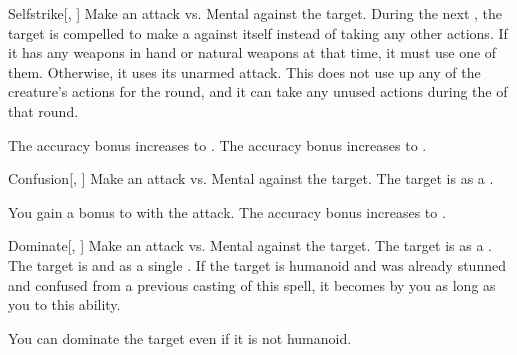 \lowercase{\hypertarget{spell:Selfstrike}{}}\label{spell:Selfstrike}
\begin{freeability}[Rank 4]{\hypertarget{spell:Selfstrike}{Selfstrike}}[, ]
Make an attack vs. Mental against the target.
\hit During the next , the target is compelled to make a  against itself instead of taking any other actions.
If it has any weapons in hand or natural weapons at that time, it must use one of them.
Otherwise, it uses its unarmed attack.
This does not use up any of the creature's actions for the round, and it can take any unused actions during the  of that round.

\rankline
{} The accuracy bonus increases to .
 The accuracy bonus increases to .
\end{freeability}
\vspace{0.25em}



\lowercase{\hypertarget{spell:Confusion}{}}\label{spell:Confusion}
\begin{freeability}[Rank 5]{\hypertarget{spell:Confusion}{Confusion}}[, ]
Make an attack vs. Mental against the target.
\hit The target is \confused as a .

\rankline
{} You gain a  bonus to  with the attack.
 The accuracy bonus increases to .
\end{freeability}
\vspace{0.25em}



\lowercase{\hypertarget{spell:Dominate}{}}\label{spell:Dominate}
\begin{freeability}[Rank 5]{\hypertarget{spell:Dominate}{Dominate}}[, ]
Make an attack vs. Mental against the target.
\hit The target is  as a .
\crit The target is  and  as a single .
If the target is humanoid and was already stunned and confused from a previous casting of this spell, it becomes  by you as long as you  to this ability.

\rankline
{} You can dominate the target even if it is not humanoid.
\end{freeability}
\vspace{0.25em}



